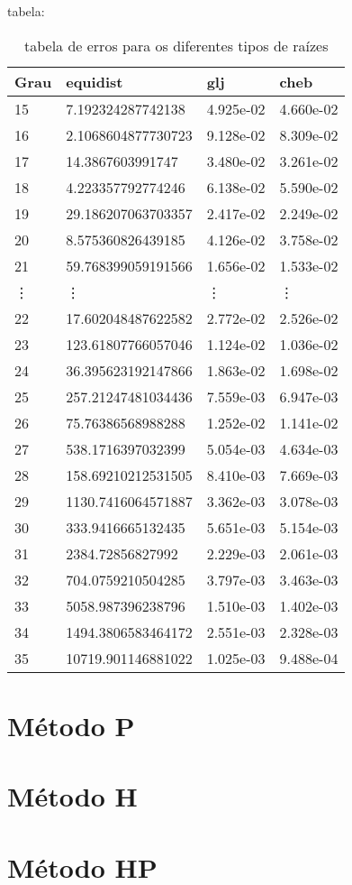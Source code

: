 	tabela:
	\begin{table}[]
\centering
\caption{tabela de erros para os diferentes tipos de raízes}
\label{my-label}
\begin{tabular}{|l|l|l|l|}
\hline
Grau & equidist           & glj       & cheb      \\ \hline
15   & 7.192324287742138  & 4.925e-02 & 4.660e-02 \\
16   & 2.1068604877730723 & 9.128e-02 & 8.309e-02 \\
17   & 14.3867603991747   & 3.480e-02 & 3.261e-02 \\
18   & 4.223357792774246  & 6.138e-02 & 5.590e-02 \\
19   & 29.186207063703357 & 2.417e-02 & 2.249e-02 \\
20   & 8.575360826439185  & 4.126e-02 & 3.758e-02 \\
21   & 59.768399059191566 & 1.656e-02 & 1.533e-02 \\
\vdots   &\vdots              & \vdots    & \vdots    \\
22   & 17.602048487622582 & 2.772e-02 & 2.526e-02 \\
23   & 123.61807766057046 & 1.124e-02 & 1.036e-02 \\
24   & 36.395623192147866 & 1.863e-02 & 1.698e-02 \\
25   & 257.21247481034436 & 7.559e-03 & 6.947e-03 \\
26   & 75.76386568988288  & 1.252e-02 & 1.141e-02 \\
27   & 538.1716397032399  & 5.054e-03 & 4.634e-03 \\
28   & 158.69210212531505 & 8.410e-03 & 7.669e-03 \\
29   & 1130.7416064571887 & 3.362e-03 & 3.078e-03 \\
30   & 333.9416665132435  & 5.651e-03 & 5.154e-03 \\
31   & 2384.72856827992   & 2.229e-03 & 2.061e-03 \\
32   & 704.0759210504285  & 3.797e-03 & 3.463e-03 \\
33   & 5058.987396238796  & 1.510e-03 & 1.402e-03 \\
34   & 1494.3806583464172 & 2.551e-03 & 2.328e-03 \\
35   & 10719.901146881022 & 1.025e-03 & 9.488e-04
\end{tabular}
\end{table}
\section{Método P}

\section{Método H}


\section{Método HP}

